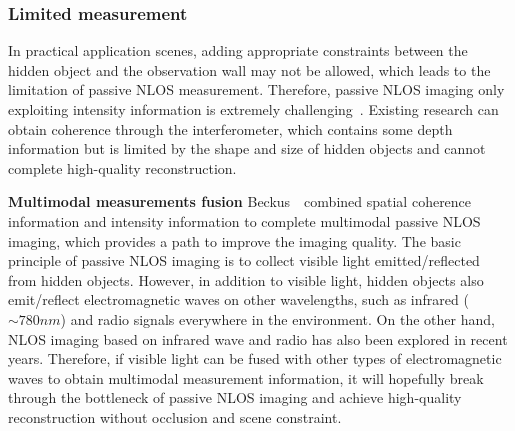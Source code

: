 \subsubsection{Limited measurement} 
In practical application scenes, adding appropriate constraints between the hidden object and the observation wall may not be allowed, which leads to the limitation of passive NLOS measurement. Therefore, passive NLOS imaging only exploiting intensity information is extremely challenging~\cite{saundersComputationalPeriscopyOrdinary2019}. Existing research can obtain coherence through the interferometer, which contains some depth information but is limited by the shape and size of hidden objects and cannot complete high-quality reconstruction.


\vspace{0.8em}
\noindent\textbf{Multimodal measurements fusion}
Beckus~\etal~combined spatial coherence information and intensity information to complete multimodal passive NLOS imaging, which provides a path to improve the imaging quality\cite{beckusMultiModalNonLineofSightPassive2019}.
The basic principle of passive NLOS imaging is to collect visible light emitted/reflected from hidden objects. However, in addition to visible light, hidden objects also emit/reflect electromagnetic waves on other wavelengths, such as infrared ($\sim 780nm$) and radio signals everywhere in the environment. On the other hand, NLOS imaging based on infrared wave\cite{8747343} and radio\cite{he_non-line--sight_2020} has also been explored in recent years. Therefore, if visible light can be fused with other types of electromagnetic waves to obtain multimodal measurement information, it will hopefully break through the bottleneck of passive NLOS imaging and achieve high-quality reconstruction without occlusion and scene constraint.

